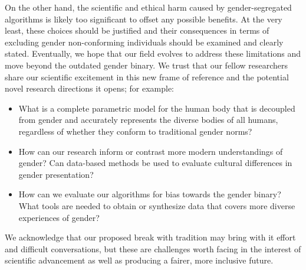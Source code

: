 \documentclass[sigconf,review,balance=false]{acmart}
\begin{document}
On the other hand, the scientific and ethical harm caused by gender-segregated
algorithms is likely too significant to offset any possible benefits. At the
very least, these choices should be justified and their consequences in terms of
excluding gender non-conforming individuals should be examined and clearly
stated. Eventually, we hope that our field evolves to address these limitations
and move beyond the outdated gender binary. We trust that our fellow researchers
share our scientific excitement in this new frame of reference and the potential
novel research directions it opens; for example:
\begin{itemize}
    \item What is a complete parametric model for the human body that is
    decoupled from gender and accurately represents the diverse bodies of all
    humans, regardless of whether they conform to traditional gender norms?
    \item How can our research inform or contrast more modern understandings of
    gender? Can data-based methods be used to evaluate cultural differences in
    gender presentation?
    \item How can we evaluate our algorithms for bias towards the gender binary?
    What tools are needed to obtain or synthesize data that covers more diverse
    experiences of gender?
\end{itemize}

We acknowledge that our proposed break with tradition may bring with it effort
and difficult conversations, but these are challenges worth facing in the
interest of scientific advancement as well as producing a fairer, more inclusive
future.



\end{document}
